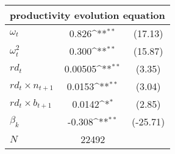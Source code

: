{
\def\sym#1{\ifmmode^{#1}\else\(^{#1}\)\fi}
\begin{tabular}{l*{1}{cc}}
\toprule
\multicolumn{3}{c}{productivity evolution equation  }\\
\midrule  
$\omega_t$       &       0.826\sym{**}&     (17.13)\\
$\omega_t^2$     &        0.300\sym{**}&     (15.87)\\

$rd_t$    &     0.00505\sym{**}&      (3.35)\\

$rd_t\times n_{t+1}$      &      0.0153\sym{**}&      (3.04)\\
$rd_t \times b_{t+1}$      &     0.0142\sym{*} &      (2.85)\\
$\beta_k$                  & -0.308\sym{**}    &     (-25.71)\\
\midrule
\(N\)       &       22492        &            \\
\bottomrule
\end{tabular}
}
